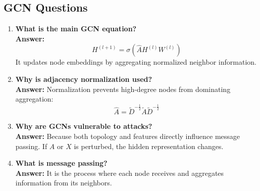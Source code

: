 \documentclass[12pt,a4paper]{article}
\begin{document}
\subsection{GCN Questions}
\begin{enumerate}[label=\textbf{Q\arabic*.},resume]
    \item \textbf{What is the main GCN equation?}\\
    \textbf{Answer:}
    $$
    H^{(l+1)}=\sigma(\hat{A}H^{(l)}W^{(l)})
    $$
    It updates node embeddings by aggregating normalized neighbor information.

    \item \textbf{Why is adjacency normalization used?}\\
    \textbf{Answer:} Normalization prevents high-degree nodes from dominating aggregation:
    $$
    \hat{A}=\tilde{D}^{-\frac{1}{2}}\tilde{A}\tilde{D}^{-\frac{1}{2}}
    $$

    \item \textbf{Why are GCNs vulnerable to attacks?}\\
    \textbf{Answer:} Because both topology and features directly influence message passing. If $A$ or $X$ is perturbed, the hidden representation changes.

    \item \textbf{What is message passing?}\\
    \textbf{Answer:} It is the process where each node receives and aggregates information from its neighbors.
\end{enumerate}
\end{document}
